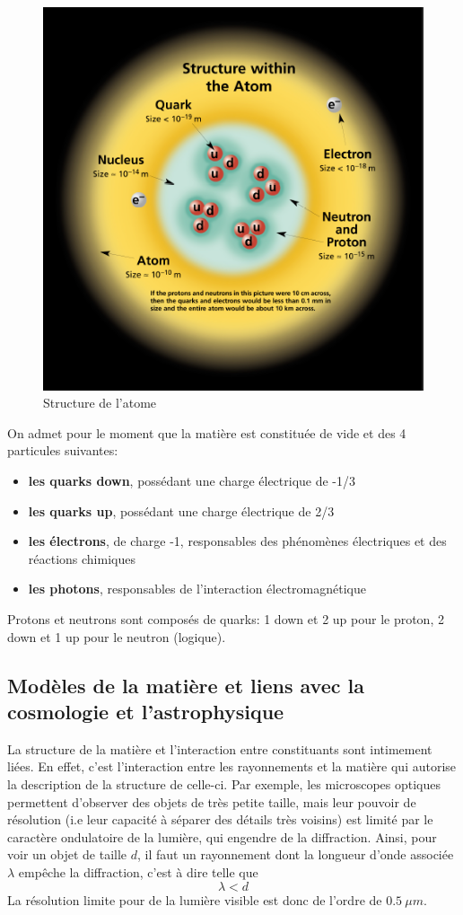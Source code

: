 \begin{figure}[ht]
    \centering
    \includegraphics[scale=0.45]{Images1/atome.png}
    \caption{Structure de l'atome}
    \label{fig:struct_atome}
\end{figure}
On admet pour le moment que la matière est constituée de vide et des 4 particules suivantes:

\begin{itemize}
    \item \textbf{les quarks down}, possédant une charge électrique de -1/3
    \item \textbf{les quarks up}, possédant une charge électrique de 2/3
    \item \textbf{les électrons}, de charge -1, responsables des phénomènes électriques et des réactions chimiques
    \item \textbf{les photons}, responsables de l'interaction électromagnétique
\end{itemize}
Protons et neutrons sont composés de quarks: 1 down et 2 up pour le proton, 2 down et 1 up pour le neutron (logique).

\subsection{Modèles de la matière et liens avec la cosmologie et l'astrophysique}
La structure de la matière et l'interaction entre constituants sont intimement liées. En effet, c'est l'interaction entre les rayonnements et la matière qui autorise la description de la structure de celle-ci. Par exemple, les microscopes optiques permettent d'observer des objets de très petite taille, mais leur pouvoir de résolution (i.e leur capacité à séparer des détails très voisins) est limité par le caractère ondulatoire de la lumière, qui engendre de la diffraction. Ainsi, pour voir un objet de taille $d$, il faut un rayonnement dont la longueur d'onde associée $\lambda$ empêche la diffraction, c'est à dire telle que
\[ \lambda < d \]
La résolution limite pour de la lumière visible est donc de l'ordre de $\SI{0.5}{\mu m}$.

